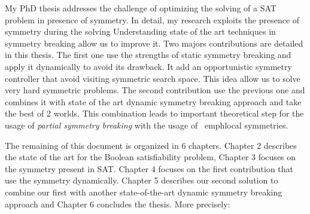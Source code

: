 %
%
%

My PhD thesis addresses the challenge of optimizing the solving of a SAT problem in presence of
symmetry. In detail, my research exploits the presence of symmetry during the solving
Understanding state of the art techniques in symmetry breaking allow us to improve it.
Two majors contributions are detailed in this thesis. The first one use the strengths of static symmetry 
breaking and apply it dynamically to avoid its drawback. It add an opportunistic symmetry controller 
that avoid visiting symmetric search space. This idea allow us to solve very hard symmetric problems.
The second contribution use the previous one and combines it with state of the art dynamic 
symmetry breaking approach and take the best of 2 worlds. This combination leads to 
important theoretical step for the usage of \emph{partial symmetry breaking} with the usage of 
\ emph{local symmetries}. 
 


The remaining of this document is organized in 6 chapters. Chapter 2 describes the state of
the art for the Boolean satisfiability problem, Chapter 3 focuses on the symmetry present in SAT.
Chapter 4 focuses on the first contribution that use the symmetry dynamically.
Chapter 5 describes our second solution to combine our first with another state-of-the-art  
dynamic symmetry breaking approach and Chapter 6 concludes the thesis. More precisely:
 
